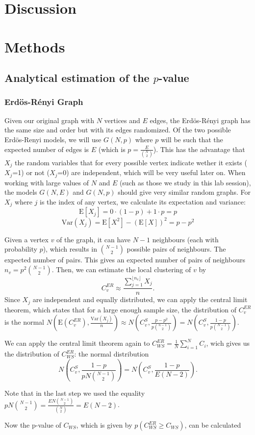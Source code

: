 \documentclass[paper=a4, fontsize=11pt]{scrartcl} %
\newcommand{\E}{\mathrm{E}}
\newcommand{\Var}{\mathrm{Var}}
\begin{document}
\section{Discussion}







\section{Methods}

\subsection{Analytical estimation of the $p$-value}
\subsubsection{Erdös-Rényi Graph}
Given our original graph with $N$ vertices and $E$ edges, the Erdös-Rényi graph has the same size and order but with its edges randomized.  Of the two possible Erdös-Renyi models, we will use $G(N,p)$ where $p$ will be such that the expected number of edges is $E$ (which is $p=\frac{E}{\binom{N}{2}}$). This has the advantage that $X_j$ the random variables that for every possible vertex indicate wether it exists ($X_j$=1) or not ($X_j$=0) are independent, which will be very useful later on. When working with large values of $N$ and $E$ (such as those we study in this lab session), the models $G(N,E)$ and $G(N,p)$ should give very similar random graphs. 
For $X_j$ where $j$ is the index of any vertex, we calculate its expectation and variance: 
$$\E[X_j]=0\cdot(1-p)+1\cdot p=p$$
$$\Var(X_j)=\E[X^2]-(\E[X])^2=p-p^2$$

Given a vertex $v$ of the graph, it can have $N-1$ neighbours (each with probability $p$), which results in $\binom{N-1}{2}$ possible pairs of neighbours. The expected number of pairs. This gives an expected number of pairs of neighbours $n_v=p^2\binom{N-1}{2}$.  Then, we can estimate the local clustering of $v$ by $$C_v^{ER}\approx \frac{\sum_{j=1}^{\lfloor n_v\rfloor}X_j}{n}.$$
Since $X_j$ are independent and equally distributed, we can apply the central limit theorem, which states that for a large enough sample size, the distribution of $C_v^{ER}$ is the normal $N(\E(C_v^{ER}),\frac{\Var(X_j)}{n})\approx N(C_v^S,\frac{p-p^2}{p\binom{n-1}{2}})=N(C_v^S,\frac{1-p}{p\binom{N-1}{2}})$. 

We can apply the central limit theorem again to $C_{WS}^{ER}=\frac{1}{N}\sum_{i=1}^NC_i$, wich gives us the distribution of $C_{WS}^{ER}$: the normal distribution $$N(C_v^S,\frac{1-p}{pN\binom{N-1}{2}})=N(C_v^S,\frac{1-p}{E(N-2)}).$$


Note that in the last step we used the equality $pN\binom{N-1}{2}=\frac{EN\binom{N-1}{2}}{\binom{N}{2}}=E(N-2)$.

Now the p-value of $C_{WS}$, which is given by $p(C_{WS}^{ER}\geq C_{WS})$, can be calculated
\end{document}
